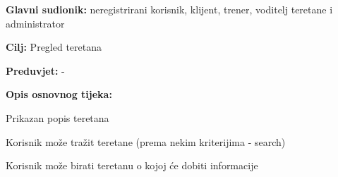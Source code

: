 					\noindent {}
					\begin{packed_item}
	
						\item \textbf{Glavni sudionik: }neregistrirani korisnik, klijent, trener, voditelj teretane i administrator
						\item  \textbf{Cilj:} Pregled teretana
						\item  \textbf{Preduvjet:} -

						\item  \textbf{Opis osnovnog tijeka:}
						
						\item[] \begin{packed_enum}
	
							\item Prikazan popis teretana
							\item Korisnik može tražit teretane (prema nekim kriterijima - search)
							\item Korisnik može birati teretanu o kojoj će dobiti informacije
						\end{packed_enum}
						\end{packed_item}
						
